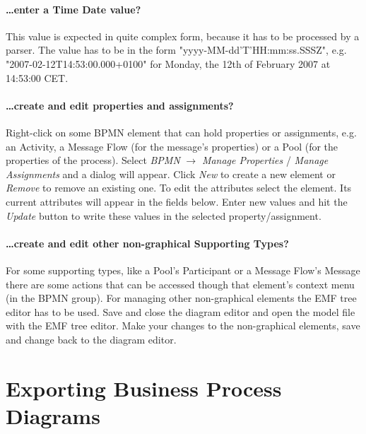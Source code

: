 \paragraph*{\dots enter a Time Date value?}
This value is expected in quite complex form, because it has to be processed by a parser. The value has to be in the form "yyyy-MM-dd'T'HH:mm:ss.SSSZ", e.g. "2007-02-12T14:53:00.000+0100" for Monday, the 12th of February 2007 at 14:53:00 CET.

\paragraph*{\dots create and edit properties and assignments?}
Right-click on some BPMN element that can hold properties or assignments, e.g. an Activity, a Message Flow (for the message's properties) or a Pool (for the properties of the process). Select \emph{BPMN} $\rightarrow$ \emph{Manage Properties} / \emph{Manage Assignments} and a dialog will appear. Click \emph{New} to create a new element or \emph{Remove} to remove an existing one. To edit the attributes select the element. Its current attributes will appear in the fields below. Enter new values and hit the \emph{Update} button to write these values in the selected property/assignment.

\paragraph*{\dots create and edit other non-graphical Supporting Types?}
For some supporting types, like a Pool's Participant or a Message Flow's Message there are some actions that can be accessed though that element's context menu (in the BPMN group). For managing other non-graphical elements the EMF tree editor has to be used. Save and close the diagram editor and open the model file with the EMF tree editor. Make your changes to the non-graphical elements, save and change back to the diagram editor.


\section{Exporting Business Process Diagrams}

